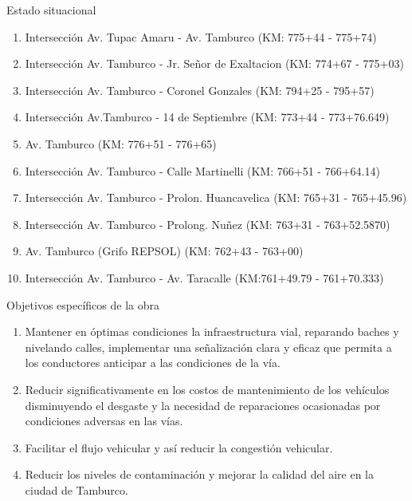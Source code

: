 \begin{frame}{Estado situacional}
    \begin{enumerate}%
		\item Intersección Av. Tupac Amaru  -  Av. Tamburco (KM: 775+44  -  775+74)
		\item Intersección Av. Tamburco  -  Jr. Señor de Exaltacion (KM: 774+67  -  775+03)
		\item Intersección Av. Tamburco  -  Coronel Gonzales (KM: 794+25  -  795+57)
		\item Intersección Av.Tamburco  -  14 de Septiembre (KM: 773+44  -  773+76.649)
		\item Av. Tamburco (KM: 776+51  -  776+65)
		\item Intersección Av. Tamburco  -  Calle Martinelli (KM: 766+51  -  766+64.14)
		\item Intersección Av. Tamburco  -  Prolon. Huancavelica (KM: 765+31  -  765+45.96)
		\item Intersección Av. Tamburco  -  Prolong. Nuñez (KM: 763+31  -  763+52.5870)
		\item Av. Tamburco (Grifo REPSOL) (KM: 762+43  -  763+00)
		\item Intersección Av. Tamburco  -  Av. Taracalle (KM:761+49.79  -  761+70.333)
	\end{enumerate}
\end{frame}

\begin{frame}{Objetivos específicos de la obra}
    \begin{enumerate}%
		\item Mantener en óptimas condiciones la infraestructura vial, reparando baches y nivelando calles, implementar una señalización clara y eficaz que permita a los conductores anticipar a las condiciones de la vía.
		\item Reducir significativamente en los costos de mantenimiento de los vehículos disminuyendo el desgaste y la necesidad de reparaciones ocasionadas por condiciones adversas en las vías.
		\item Facilitar el flujo vehicular y así reducir la congestión vehicular.
		\item Reducir los niveles de contaminación y mejorar la calidad del aire en la ciudad de Tamburco.
	\end{enumerate}
\end{frame}

